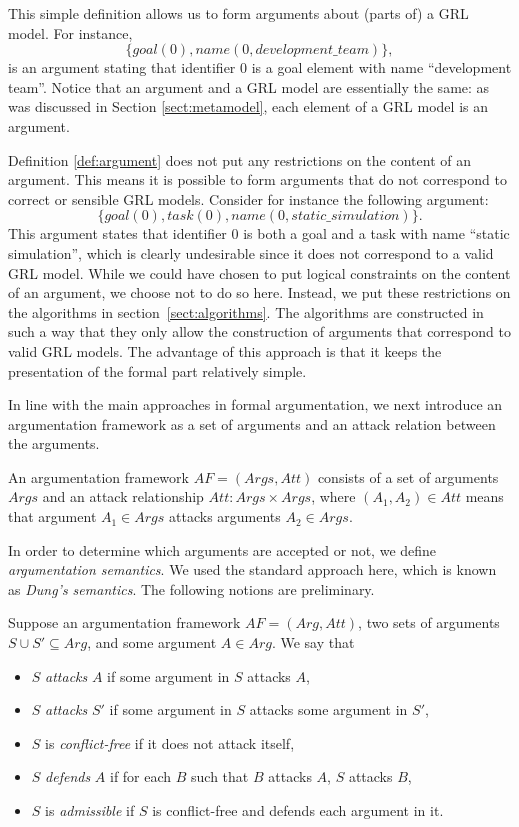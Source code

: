 This simple definition allows us to form arguments about (parts of) a GRL model. For instance, $$\{goal(0),name(0,development\_team)\},$$ is an argument stating that identifier 0 is a goal element with name ``development team''. Notice that an argument and a GRL model are essentially the same: as was discussed in Section \ref{sect:metamodel}, each element of a GRL model is an argument. 

Definition \ref{def:argument} does not put any restrictions on the content of an argument. This means it is possible to form arguments that do not correspond to correct or sensible GRL models. Consider for instance the following argument: $$\{goal(0), task(0), name(0,static\_simulation)\}.$$ This argument states that identifier 0 is both a goal and a task with name ``static simulation'', which is clearly undesirable since it does not correspond to a valid GRL model. While we could have chosen to put logical constraints on the content of an argument, we choose not to do so here. Instead, we put these restrictions on the algorithms in section~\ref{sect:algorithms}. The algorithms are constructed in such a way that they only allow the construction of arguments that correspond to valid GRL models. The advantage of this approach is that it keeps the presentation of the formal part relatively simple.

In line with the main approaches in formal argumentation, we next introduce an argumentation framework as a set of arguments and an attack relation between the arguments.

\begin{definition} \label{def:argumentationframework}
An argumentation framework $AF=(Args,Att)$ consists of a set of arguments $Args$ and an attack relationship $Att:Args\times Args$, where $(A_1,A_2)\in Att$ means that argument $A_1\in Args$ attacks arguments $A_2\in Args$.
\end{definition}

In order to determine which arguments are accepted or not, we define \emph{argumentation semantics}. We used the standard approach here, which is known as \emph{Dung's semantics}. The following notions are preliminary.

\begin{definition} Suppose an argumentation framework $AF=(Arg,Att)$, two sets of arguments $S\cup S'\subseteq Arg$, and some argument $A\in Arg$. We say that
\begin{itemize}
\item $S$ \emph{attacks} $A$ if some argument in $S$ attacks $A$,
\item $S$ \emph{attacks} $S'$ if some argument in $S$ attacks some argument in $S'$,
\item $S$ is \emph{conflict-free} if it does not attack itself,
\item $S$ \emph{defends} $A$ if for each $B$ such that $B$ attacks $A$, $S$ attacks $B$,
\item $S$ is \emph{admissible} if $S$ is conflict-free and defends each argument in it.
\end{itemize}
\end{definition}


